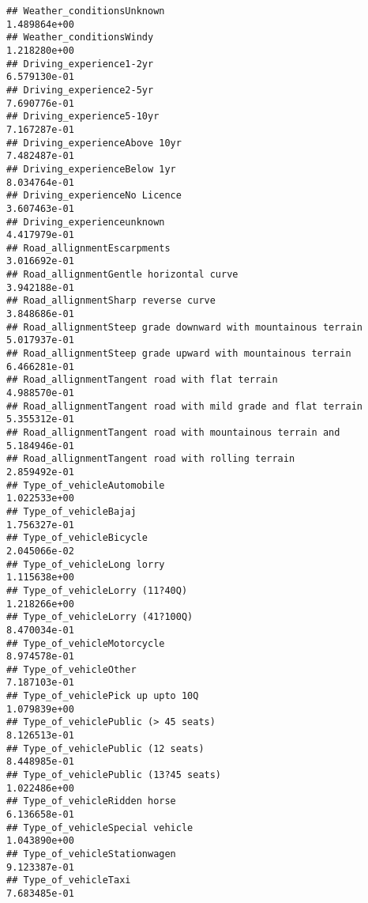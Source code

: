 \documentclass[
]{article}
\begin{document}
\begin{verbatim}
## Weather_conditionsUnknown                                    1.489864e+00
## Weather_conditionsWindy                                      1.218280e+00
## Driving_experience1-2yr                                      6.579130e-01
## Driving_experience2-5yr                                      7.690776e-01
## Driving_experience5-10yr                                     7.167287e-01
## Driving_experienceAbove 10yr                                 7.482487e-01
## Driving_experienceBelow 1yr                                  8.034764e-01
## Driving_experienceNo Licence                                 3.607463e-01
## Driving_experienceunknown                                    4.417979e-01
## Road_allignmentEscarpments                                   3.016692e-01
## Road_allignmentGentle horizontal curve                       3.942188e-01
## Road_allignmentSharp reverse curve                           3.848686e-01
## Road_allignmentSteep grade downward with mountainous terrain 5.017937e-01
## Road_allignmentSteep grade upward with mountainous terrain   6.466281e-01
## Road_allignmentTangent road with flat terrain                4.988570e-01
## Road_allignmentTangent road with mild grade and flat terrain 5.355312e-01
## Road_allignmentTangent road with mountainous terrain and     5.184946e-01
## Road_allignmentTangent road with rolling terrain             2.859492e-01
## Type_of_vehicleAutomobile                                    1.022533e+00
## Type_of_vehicleBajaj                                         1.756327e-01
## Type_of_vehicleBicycle                                       2.045066e-02
## Type_of_vehicleLong lorry                                    1.115638e+00
## Type_of_vehicleLorry (11?40Q)                                1.218266e+00
## Type_of_vehicleLorry (41?100Q)                               8.470034e-01
## Type_of_vehicleMotorcycle                                    8.974578e-01
## Type_of_vehicleOther                                         7.187103e-01
## Type_of_vehiclePick up upto 10Q                              1.079839e+00
## Type_of_vehiclePublic (> 45 seats)                           8.126513e-01
## Type_of_vehiclePublic (12 seats)                             8.448985e-01
## Type_of_vehiclePublic (13?45 seats)                          1.022486e+00
## Type_of_vehicleRidden horse                                  6.136658e-01
## Type_of_vehicleSpecial vehicle                               1.043890e+00
## Type_of_vehicleStationwagen                                  9.123387e-01
## Type_of_vehicleTaxi                                          7.683485e-01

\end{verbatim}
\end{document}

